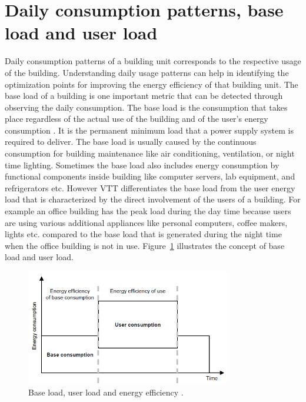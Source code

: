 \section{Daily consumption patterns, base load and user load}\label{daily}
Daily consumption patterns of a building unit corresponds to the respective usage of the building. Understanding daily usage patterns can help in identifying the optimization points for improving the energy efficiency of that building unit. The base load of a building is one important metric that can be detected through observing the daily consumption. The base load is the consumption that takes place regardless of the actual use of the building and of the user's energy consumption  \cite{forsstrommeasuring}. It is the permanent minimum load that a power supply system is required to deliver. The base load is usually caused by the continuous consumption for building maintenance like air conditioning, ventilation, or night time lighting. Sometimes the base load also includes energy consumption by functional components inside building like computer servers, lab equipment, and refrigerators etc. However VTT differentiates the base load from the user energy load that is characterized by the direct involvement of the users of a building. For example an office building has the peak load during the day time because users are using various additional appliances like personal computers, coffee makers, lights etc. compared to the base load that is generated during the night time when the office building is not in use. Figure~\ref{fig:baseload} illustrates the concept of base load and user load.
\begin{figure}[!ht]
  \begin{center}
    \includegraphics[width=0.8\textwidth]{images/baseload.png}
    \caption{ Base load, user load and energy efficiency \cite{forsstrommeasuring}.}
    \label{fig:baseload}
  \end{center}
\end{figure}

